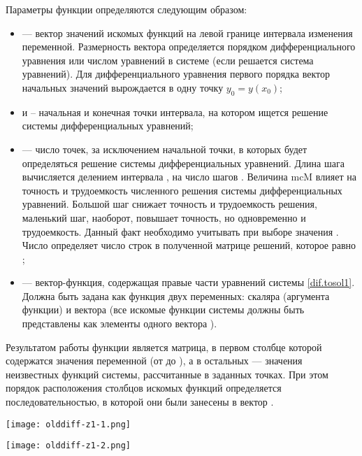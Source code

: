 Параметры функции  определяются следующим образом:
 \begin{itemize}[label={}]
 	\item {} --- вектор значений искомых функций на левой границе интервала изменения переменной. Размерность вектора определяется порядком дифференциального уравнения или числом уравнений в системе (если решается система уравнений). Для дифференциального уравнения первого порядка вектор начальных значений вырождается в одну точку $y_0 = y(x_0)$;
 	\item {} и  – начальная и конечная точки интервала, на котором ищется решение системы дифференциальных уравнений;
 	\item {} --- число точек, за исключением начальной точки, в которых будет определяться решение системы дифференциальных уравнений. Длина шага вычисляется делением интервала , на число шагов . Величина mc{M} влияет на точность и трудоемкость численного решения системы дифференциальных уравнений. Большой шаг снижает точность и трудоемкость решения, маленький шаг, наоборот, повышает точность, но одновременно и трудоемкость. Данный факт необходимо учитывать при выборе значения . Число  определяет число строк в полученной матрице решений, которое равно ;
 	\item {} --- вектор-функция, содержащая правые части уравнений системы \ref{dif.tosol1}. Должна быть задана как функция двух переменных: скаляра  (аргумента функции) и вектора  (все искомые функции системы должны быть представлены как элементы одного вектора ).
 \end{itemize}
 
Результатом работы функции  является матрица, в первом столбце которой содержатся значения переменной  (от  до ), а в остальных --- значения неизвестных функций системы, рассчитанные в заданных точках. При этом порядок расположения столбцов искомых функций определяется последовательностью, в которой они были занесены в вектор .


\begin{center}
	\texttt{[image: olddiff-z1-1.png]}
\end{center}

\begin{center}
	\texttt{[image: olddiff-z1-2.png]}
\end{center}


